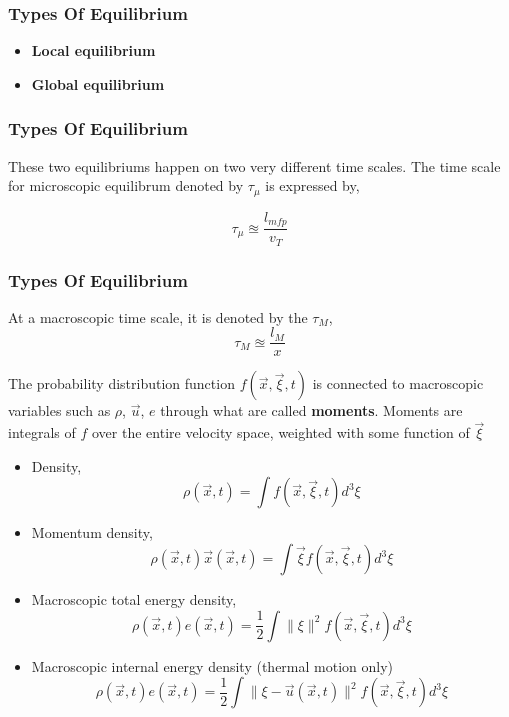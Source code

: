 \documentclass{beamer}
\begin{document}
\begin{frame}
	\frametitle{Types Of Equilibrium}
\begin{itemize}
	\item \textbf{Local equilibrium}
	\item \textbf{Global equilibrium}
\end{itemize}
\end{frame}
\begin{frame}
\frametitle{Types Of Equilibrium}
These two equilibriums happen on two very different time scales.
The time scale for microscopic equilibrum denoted by $\tau_{\mu}$ is expressed by,

\[
	\tau_{\mu} \approxeq \frac{l_{mfp}}{v_T}
\]
\end{frame}
\begin{frame}
\frametitle{Types Of Equilibrium}
At a macroscopic time scale, it is denoted by the $\tau_{M}$,
\[
	\tau_{M} \approxeq \frac{l_M}{x}
\]
\end{frame}
\begin{frame}
The probability distribution function $f(\vec{x}, \vec{\xi}, t)$ is connected to macroscopic variables such as $\rho$, $\vec{u}$, $e$ through what are called \textbf{moments}.
Moments are integrals of $f$ over the entire velocity space, weighted with some function of $\vec{\xi}$
\end{frame}
\begin{frame}
\begin{itemize}
	\item<1-> Density, $$\rho(\vec{x},t) = \int f(\vec{x}, \vec{\xi}, t) d^3 \xi$$
	\item<2-> Momentum density,
		$$\rho(\vec{x},t) \vec{x}(\vec{x},t) = \int \vec{\xi} f(\vec{x}, \vec{\xi}, t) d^3 \xi$$
	\item<3-> Macroscopic total energy density,
		$$\rho(\vec{x},t) e(\vec{x},t) = \frac{1}{2} \int \| \xi \|^2 f(\vec{x},\vec{\xi},t) d^3 \xi$$ 
	\item<4-> Macroscopic internal energy density (thermal motion only)
		$$\rho(\vec{x},t) e(\vec{x},t) = \frac{1}{2} \int \| \xi - \vec{u}(\vec{x},t) \|^2 f(\vec{x},\vec{\xi},t) d^3 \xi$$
\end{itemize}
\end{frame}
\end{document}
